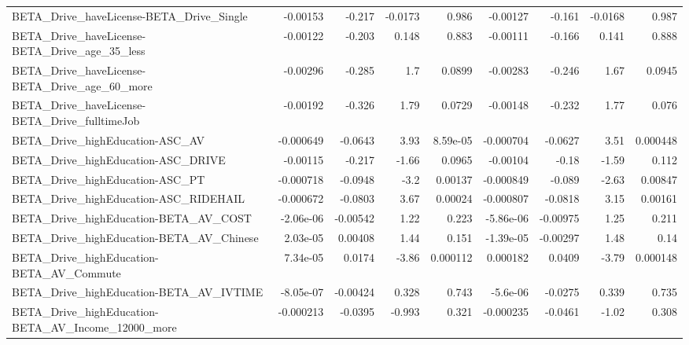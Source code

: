 \begin{tabular}{lrrrrrrrr}
BETA\_Drive\_haveLicense-BETA\_Drive\_Single           &    -0.00153 &       -0.217 &  -0.0173 &    0.986 &   -0.00127 &      -0.161 &      -0.0168 &         0.987 \\
BETA\_Drive\_haveLicense-BETA\_Drive\_age\_35\_less      &    -0.00122 &       -0.203 &    0.148 &    0.883 &   -0.00111 &      -0.166 &        0.141 &         0.888 \\
BETA\_Drive\_haveLicense-BETA\_Drive\_age\_60\_more      &    -0.00296 &       -0.285 &      1.7 &   0.0899 &   -0.00283 &      -0.246 &         1.67 &        0.0945 \\
BETA\_Drive\_haveLicense-BETA\_Drive\_fulltimeJob      &    -0.00192 &       -0.326 &     1.79 &   0.0729 &   -0.00148 &      -0.232 &         1.77 &         0.076 \\
BETA\_Drive\_highEducation-ASC\_AV                    &   -0.000649 &      -0.0643 &     3.93 & 8.59e-05 &  -0.000704 &     -0.0627 &         3.51 &      0.000448 \\
BETA\_Drive\_highEducation-ASC\_DRIVE                 &    -0.00115 &       -0.217 &    -1.66 &   0.0965 &   -0.00104 &       -0.18 &        -1.59 &         0.112 \\
BETA\_Drive\_highEducation-ASC\_PT                    &   -0.000718 &      -0.0948 &     -3.2 &  0.00137 &  -0.000849 &      -0.089 &        -2.63 &       0.00847 \\
BETA\_Drive\_highEducation-ASC\_RIDEHAIL              &   -0.000672 &      -0.0803 &     3.67 &  0.00024 &  -0.000807 &     -0.0818 &         3.15 &       0.00161 \\
BETA\_Drive\_highEducation-BETA\_AV\_COST              &   -2.06e-06 &     -0.00542 &     1.22 &    0.223 &  -5.86e-06 &    -0.00975 &         1.25 &         0.211 \\
BETA\_Drive\_highEducation-BETA\_AV\_Chinese           &    2.03e-05 &      0.00408 &     1.44 &    0.151 &  -1.39e-05 &    -0.00297 &         1.48 &          0.14 \\
BETA\_Drive\_highEducation-BETA\_AV\_Commute           &    7.34e-05 &       0.0174 &    -3.86 & 0.000112 &   0.000182 &      0.0409 &        -3.79 &      0.000148 \\
BETA\_Drive\_highEducation-BETA\_AV\_IVTIME            &   -8.05e-07 &     -0.00424 &    0.328 &    0.743 &   -5.6e-06 &     -0.0275 &        0.339 &         0.735 \\
BETA\_Drive\_highEducation-BETA\_AV\_Income\_12000\_more &   -0.000213 &      -0.0395 &   -0.993 &    0.321 &  -0.000235 &     -0.0461 &        -1.02 &         0.308 \\

\end{tabular}
